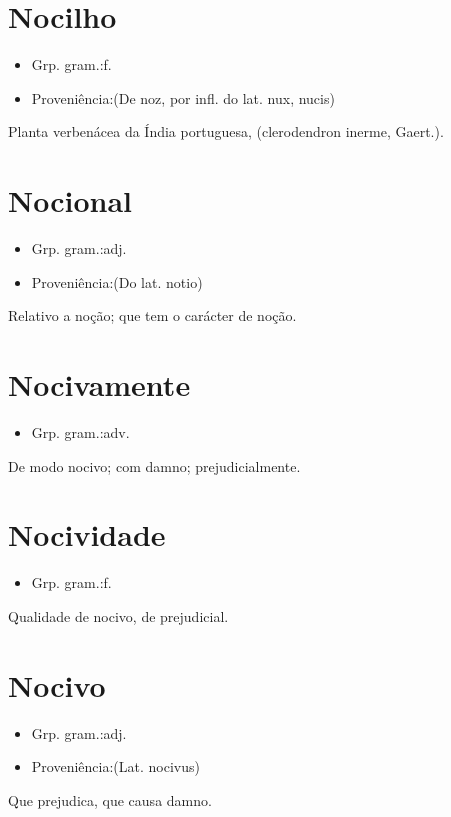 \section{Nocilho}
\begin{itemize}
\item {Grp. gram.:f.}
\end{itemize}
\begin{itemize}
\item {Proveniência:(De \textunderscore noz\textunderscore , por infl. do lat. \textunderscore nux\textunderscore , \textunderscore nucis\textunderscore )}
\end{itemize}
Planta verbenácea da Índia portuguesa, (\textunderscore clerodendron inerme\textunderscore , Gaert.).
\section{Nocional}
\begin{itemize}
\item {Grp. gram.:adj.}
\end{itemize}
\begin{itemize}
\item {Proveniência:(Do lat. \textunderscore notio\textunderscore )}
\end{itemize}
Relativo a noção; que tem o carácter de noção.
\section{Nocivamente}
\begin{itemize}
\item {Grp. gram.:adv.}
\end{itemize}
De modo nocivo; com damno; prejudicialmente.
\section{Nocividade}
\begin{itemize}
\item {Grp. gram.:f.}
\end{itemize}
Qualidade de nocivo, de prejudicial.
\section{Nocivo}
\begin{itemize}
\item {Grp. gram.:adj.}
\end{itemize}
\begin{itemize}
\item {Proveniência:(Lat. \textunderscore nocivus\textunderscore )}
\end{itemize}
Que prejudica, que causa damno.
